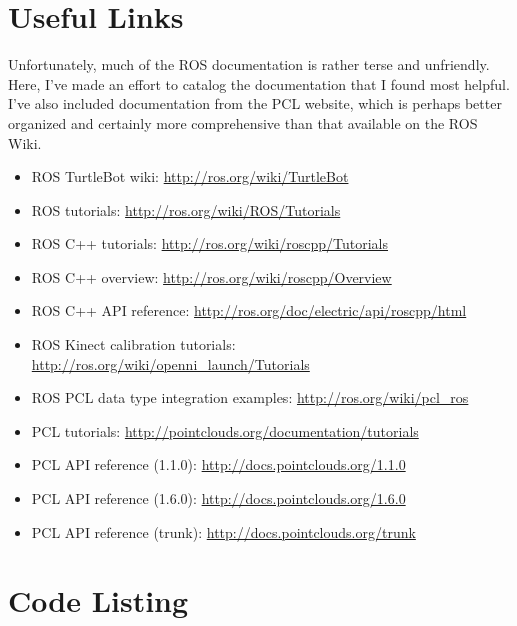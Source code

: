 \documentclass[12pt]{report}
\begin{document}
\section{Useful Links}
Unfortunately, much of the ROS documentation is rather terse and unfriendly.  Here, I've made an effort to catalog the documentation that I found most helpful.  I've also included documentation from the PCL website, which is perhaps better organized and certainly more comprehensive than that available on the ROS Wiki.
\begin{sloppypar}
\begin{itemize}
\item{ROS TurtleBot wiki: \url{http://ros.org/wiki/TurtleBot}}
\item{ROS tutorials: \url{http://ros.org/wiki/ROS/Tutorials}}
\item{ROS C++ tutorials: \url{http://ros.org/wiki/roscpp/Tutorials}}
\item{ROS C++ overview: \url{http://ros.org/wiki/roscpp/Overview}}
\item{ROS C++ API reference: \url{http://ros.org/doc/electric/api/roscpp/html}}
\item{ROS Kinect calibration tutorials: \url{http://ros.org/wiki/openni_launch/Tutorials}}
\item{ROS PCL data type integration examples: \url{http://ros.org/wiki/pcl_ros}}
\item{PCL tutorials: \url{http://pointclouds.org/documentation/tutorials}}
\item{PCL API reference (1.1.0): \url{http://docs.pointclouds.org/1.1.0}}
\item{PCL API reference (1.6.0): \url{http://docs.pointclouds.org/1.6.0}}
\item{PCL API reference (trunk): \url{http://docs.pointclouds.org/trunk}}
\end{itemize}
\end{sloppypar}

\section{Code Listing}

\end{document}
